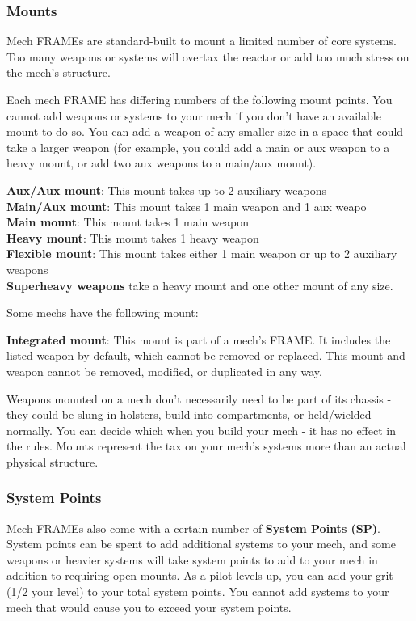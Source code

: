 \subsubsection{Mounts}

Mech FRAMEs are standard-built to mount a limited number of core systems. Too many weapons or systems will overtax the reactor or add too much stress on the mech's structure. 

Each mech FRAME has differing numbers of the following mount points. You cannot add weapons or systems to your mech if you don't have an available mount to do so. You can add a weapon of any smaller size in a space that could take a larger weapon (for example, you could add a main or aux weapon to a heavy mount, or add two aux weapons to a main/aux mount).

\textbf{Aux/Aux mount}: This mount takes up to 2 auxiliary weapons\\ 
\textbf{Main/Aux mount}: This mount takes 1 main weapon and 1 aux weapo\\
\textbf{Main mount}: This mount takes 1 main weapon\\
\textbf{Heavy mount}:  This mount takes 1 heavy weapon\\
\textbf{Flexible mount}: This mount takes either 1 main weapon or up to 2 auxiliary weapons\\

\textbf{Superheavy weapons} take a heavy mount and one other mount of any size.

Some mechs have the following mount:

\textbf{Integrated mount}: This mount is part of a mech's FRAME. It includes the listed weapon by default, which cannot be removed or replaced. This mount and weapon cannot be removed, modified, or duplicated in any way. 

Weapons mounted on a mech don't necessarily need to be part of its chassis - they could be slung in holsters, build into compartments, or held/wielded normally. You can decide which when you build your mech - it has no effect in the rules. Mounts represent the tax on your mech's systems more than an actual physical structure.


\subsubsection{System Points}

Mech FRAMEs also come with a certain number of \textbf{System Points (SP)}. System points can be spent to add additional systems to your mech, and some weapons or heavier systems will take system points to add to your mech in addition to requiring open mounts. As a pilot levels up, you can add your grit (1/2 your level) to your total system points. You cannot add systems to your mech that would cause you to exceed your system points.

